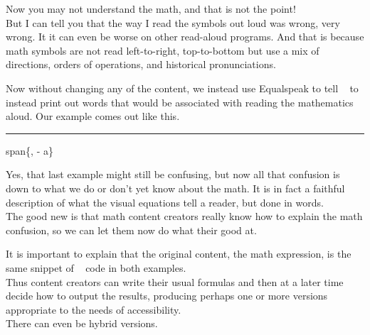 \documentclass[presentation,aspectratio=169]{beamer}
\begin{document}
\begin{frame} 
    Now you may not understand the math, and that is not the point!\\[20pt]

    But I can tell you that the way I read the symbols out loud was 
    wrong, very wrong.  It it can even be worse on other read-aloud 
    programs. And that is because math symbols are not read left-to-right, 
    top-to-bottom but use a mix of directions, orders of operations, and 
    historical pronunciations.

\end{frame}

\begin{frame}
Now without changing any of the content, we instead use Equalspeak 
to tell \LaTeXe ~ to 
instead print out words that would be associated with reading the 
mathematics aloud.  Our example comes out like this.\\[20pt]
\rule{\textwidth}{1pt}

\speakifytext
\begin{center}
    span\left\{, -
    a\cdot {}\right\}
\end{center}
\endspeakifytext
\end{frame}

\begin{frame}
    Yes, that last example might still be confusing, but now 
    all that confusion is down to what we do or don't yet know about 
    the math.  It is in fact a faithful description of what the 
    visual equations tell a reader, but done in words.\\[20pt]
    
    
    The good 
    new is that math content creators really know how to explain the math 
    confusion, so we can let them now do what their good at.
\end{frame}

\begin{frame}
    It is important to explain that the original content, the 
    math expression, is the same snippet of \LaTeXe ~ code in both examples.\\[20pt]
    
    Thus content creators can write their usual formulas 
    and then at a later time decide how to output the results, 
    producing perhaps one or more versions appropriate to the needs 
    of accessibility.\\
    
    There can even be hybrid versions.    
\end{frame}
\end{document}
